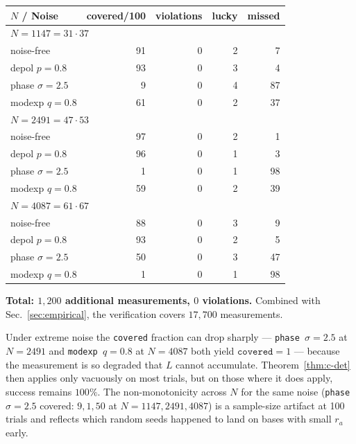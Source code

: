 \documentclass[11pt]{article}
\begin{document}
\begin{center}
\begin{tabular}{lrrrr}
\toprule
$N$ / Noise & covered/100 & violations & lucky & missed \\
\midrule
\multicolumn{5}{l}{\emph{$N = 1147 = 31 \cdot 37$}} \\
\quad noise-free          & 91 & 0 & 2 &  7 \\
\quad depol $p=0.8$       & 93 & 0 & 3 &  4 \\
\quad phase $\sigma=2.5$  &  9 & 0 & 4 & 87 \\
\quad modexp $q=0.8$      & 61 & 0 & 2 & 37 \\
\midrule
\multicolumn{5}{l}{\emph{$N = 2491 = 47 \cdot 53$}} \\
\quad noise-free          & 97 & 0 & 2 &  1 \\
\quad depol $p=0.8$       & 96 & 0 & 1 &  3 \\
\quad phase $\sigma=2.5$  &  1 & 0 & 1 & 98 \\
\quad modexp $q=0.8$      & 59 & 0 & 2 & 39 \\
\midrule
\multicolumn{5}{l}{\emph{$N = 4087 = 61 \cdot 67$}} \\
\quad noise-free          & 88 & 0 & 3 &  9 \\
\quad depol $p=0.8$       & 93 & 0 & 2 &  5 \\
\quad phase $\sigma=2.5$  & 50 & 0 & 3 & 47 \\
\quad modexp $q=0.8$      &  1 & 0 & 1 & 98 \\
\bottomrule
\end{tabular}
\end{center}

\noindent
\textbf{Total: $1{,}200$ additional measurements, $0$ violations.} Combined with Sec.~\ref{sec:empirical}, the verification covers $17{,}700$ measurements.

Under extreme noise the \texttt{covered} fraction can drop sharply --- \texttt{phase $\sigma = 2.5$} at $N = 2491$ and \texttt{modexp $q = 0.8$} at $N = 4087$ both yield $\texttt{covered} = 1$ --- because the measurement is so degraded that $L$ cannot accumulate. Theorem~\ref{thm:c-det} then applies only vacuously on most trials, but on those where it does apply, success remains $100\%$. The non-monotonicity across $N$ for the same noise (\texttt{phase $\sigma = 2.5$} covered: $9, 1, 50$ at $N = 1147, 2491, 4087$) is a sample-size artifact at 100 trials and reflects which random seeds happened to land on bases with small $r_a$ early.
\end{document}
